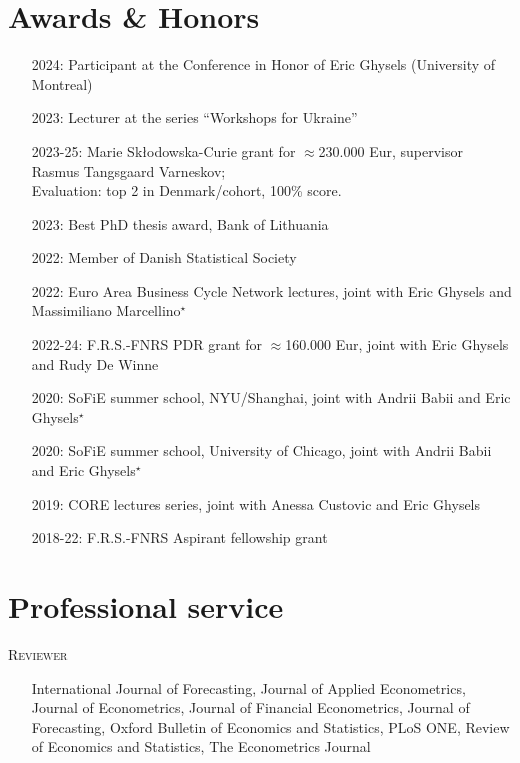 \documentclass[10pt]{article}
\newcommand{\thestarnogap}{{\Large{\color{blue}\ensuremath{^\star}}}}
\begin{document}
	\section*{Awards \& Honors}
	\vspace{-0.5em}
	\begin{itemize}[leftmargin=4.5em]
		\setlength\itemsep{-0.1em}
		\item[2024:] Participant at the Conference in Honor of Eric Ghysels (University of Montreal)
		\item[2023:] Lecturer at the series ``Workshops for Ukraine''
		\item[2023-25:] Marie Skłodowska-Curie grant for $\approx$230.000 Eur, supervisor Rasmus Tangsgaard Varneskov; \\ %
		\hspace*{0.5em} Evaluation: top 2 in Denmark/cohort, 100\% score.
		\item[2023:] Best PhD thesis award, Bank of Lithuania
		\item[2022:] Member of Danish Statistical Society
		\item[2022:] Euro Area Business Cycle Network lectures, joint with Eric Ghysels and Massimiliano Marcellino\thestarnogap
		\item[2022-24:] F.R.S.-FNRS PDR grant for $\approx$160.000 Eur, joint with Eric Ghysels and Rudy De Winne
		\item[2020:] SoFiE summer school, NYU/Shanghai, joint with Andrii Babii and Eric Ghysels\thestarnogap
		\item[2020:] SoFiE summer school, University of Chicago, joint with Andrii Babii and Eric Ghysels\thestarnogap
		\item[2019:] CORE lectures series, joint with Anessa Custovic and Eric Ghysels
		\item[2018-22:] F.R.S.-FNRS Aspirant fellowship grant
	\end{itemize}
	

	\section*{Professional service}
	\vspace{-0.5em}
	\hspace{1em}\textsc{Reviewer}
	\vspace{-0.5em}
	\begin{itemize}[leftmargin=1.5em]
		\setlength\itemsep{-0.1em}
		\item[]  International Journal of Forecasting, Journal of Applied Econometrics, Journal of Econometrics, Journal of Financial Econometrics, Journal of Forecasting, Oxford Bulletin of Economics and Statistics,  PLoS ONE, Review of Economics and Statistics, The Econometrics Journal
	\end{itemize}
	
\end{document}
